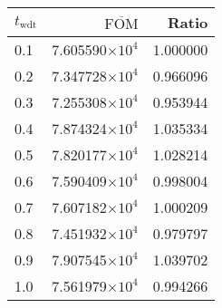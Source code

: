 \begin{tabular}{lrr}
\toprule
$t_{\mathrm{wdt}}$ & $\overline{\mathrm{FOM}}$ &    Ratio \\
\midrule
               0.1 &   7.605590$\times 10^{4}$ & 1.000000 \\
               0.2 &   7.347728$\times 10^{4}$ & 0.966096 \\
               0.3 &   7.255308$\times 10^{4}$ & 0.953944 \\
               0.4 &   7.874324$\times 10^{4}$ & 1.035334 \\
               0.5 &   7.820177$\times 10^{4}$ & 1.028214 \\
               0.6 &   7.590409$\times 10^{4}$ & 0.998004 \\
               0.7 &   7.607182$\times 10^{4}$ & 1.000209 \\
               0.8 &   7.451932$\times 10^{4}$ & 0.979797 \\
               0.9 &   7.907545$\times 10^{4}$ & 1.039702 \\
               1.0 &   7.561979$\times 10^{4}$ & 0.994266 \\
\bottomrule
\end{tabular}
